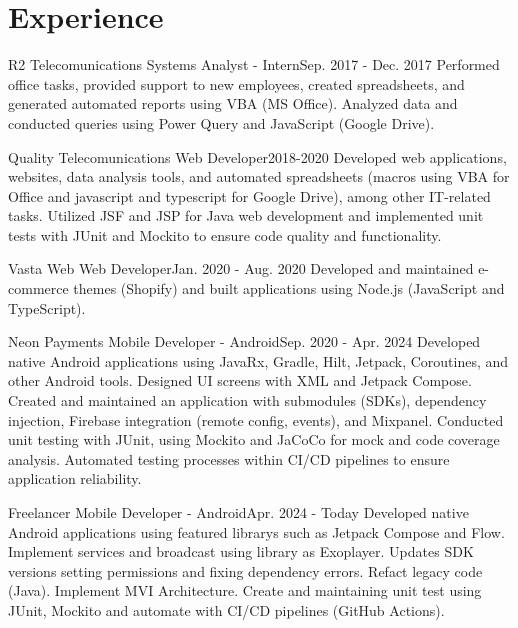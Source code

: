\section{Experience}
  \resumeSubHeadingListStart

    \resumeSubheading
      {R2 Telecomunications}{}
      {Systems Analyst - Intern}{Sep. 2017 - Dec. 2017}
      \resumeItemListStart
          {Performed office tasks, provided support to new employees, created spreadsheets, and generated automated reports using VBA (MS Office). Analyzed data and conducted queries using Power Query and JavaScript (Google Drive).}
      \resumeItemListEnd

    \resumeSubheading
      {Quality Telecomunications}{}
      {Web Developer}{2018-2020}
      \resumeItemListStart
          {Developed web applications, websites, data analysis tools, and automated spreadsheets (macros using VBA for Office and javascript and typescript for Google Drive), among other IT-related tasks. Utilized JSF and JSP for Java web development and implemented unit tests with JUnit and Mockito to ensure code quality and functionality.}
      \resumeItemListEnd

    \resumeSubheading
      {Vasta Web}{}
      {Web Developer}{Jan. 2020 - Aug. 2020}
      \resumeItemListStart
          {Developed and maintained e-commerce themes (Shopify) and built applications using Node.js (JavaScript and TypeScript).}
      \resumeItemListEnd

    \resumeSubheading
      {Neon Payments}{}
      {Mobile Developer - Android}{Sep. 2020 - Apr. 2024}
      \resumeItemListStart
          {Developed native Android applications using JavaRx, Gradle, Hilt, Jetpack, Coroutines, and other Android tools. Designed UI screens with XML and Jetpack Compose. Created and maintained an application with submodules (SDKs), dependency injection, Firebase integration (remote config, events), and Mixpanel.}
          {Conducted unit testing with JUnit, using Mockito and JaCoCo for mock and code coverage analysis. Automated testing processes within CI/CD pipelines to ensure application reliability.}
      \resumeItemListEnd

    \resumeSubheading
      {Freelancer}{}
      {Mobile Developer - Android}{Apr. 2024 - Today}
      \resumeItemListStart
          {Developed native Android applications using featured librarys such as Jetpack Compose and Flow. Implement services and broadcast using library as Exoplayer. Updates SDK versions setting permissions and fixing dependency errors. Refact legacy code (Java). Implement MVI Architecture. Create and maintaining unit test using JUnit, Mockito and automate with CI/CD pipelines (GitHub Actions).}
      \resumeItemListEnd

